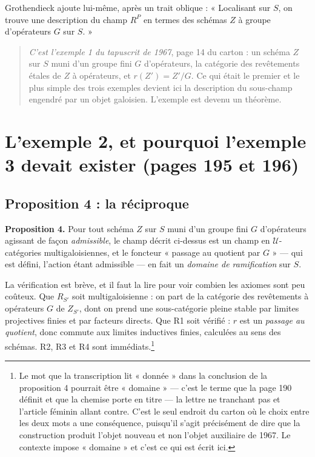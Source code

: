\documentclass[11pt,a4paper]{article}
\begin{document}
Grothendieck ajoute lui-même, après un trait oblique : « Localisant sur $S$, on
trouve une description du champ $R^{P}$ en termes des schémas $Z$ à groupe
d'opérateurs $G$ sur $S$. »

\begin{quote}
\emph{C'est l'exemple 1 du tapuscrit de 1967}, page 14 du carton : un schéma
$Z$ sur $S$ muni d'un groupe fini $G$ d'opérateurs, la catégorie des
revêtements étales de $Z$ à opérateurs, et $r(Z') = Z'/G$. Ce qui était le
premier et le plus simple des trois exemples devient ici la description du
sous-champ engendré par un objet galoisien. L'exemple est devenu un théorème.
\end{quote}

\section*{L'exemple 2, et pourquoi l'exemple 3 devait exister (pages 195 et 196)}

\subsection*{Proposition 4 : la réciproque}

\textbf{Proposition 4.} Pour tout schéma $Z$ sur $S$ muni d'un groupe fini $G$
d'opérateurs agissant de façon \emph{admissible}, le champ décrit ci-dessus est
un champ en $\mathcal{U}$-catégories multigaloisiennes, et le foncteur
« passage au quotient par $G$ » --- qui est défini, l'action étant admissible
--- en fait un \emph{domaine de ramification} sur $S$.

La vérification est brève, et il faut la lire pour voir combien les axiomes
sont peu coûteux. Que $R_{S'}$ soit multigaloisienne : on part de la catégorie
des revêtements à opérateurs $G$ de $Z_{S'}$, dont on prend une sous-catégorie
pleine stable par limites projectives finies et par facteurs directs. Que R1
soit vérifié : $r$ est un \emph{passage au quotient}, donc commute aux limites
inductives finies, calculées au sens des schémas. R2, R3 et R4 sont
immédiats.\footnote{Le mot que la transcription lit « donnée » dans la
conclusion de la proposition 4 pourrait être « domaine » --- c'est le terme que
la page 190 définit et que la chemise porte en titre --- la lettre ne tranchant
pas et l'article féminin allant contre. C'est le seul endroit du carton où le
choix entre les deux mots a une conséquence, puisqu'il s'agit précisément de
dire que la construction produit l'objet nouveau et non l'objet auxiliaire de
1967. Le contexte impose « domaine » et c'est ce qui est écrit ici.}
\end{document}
